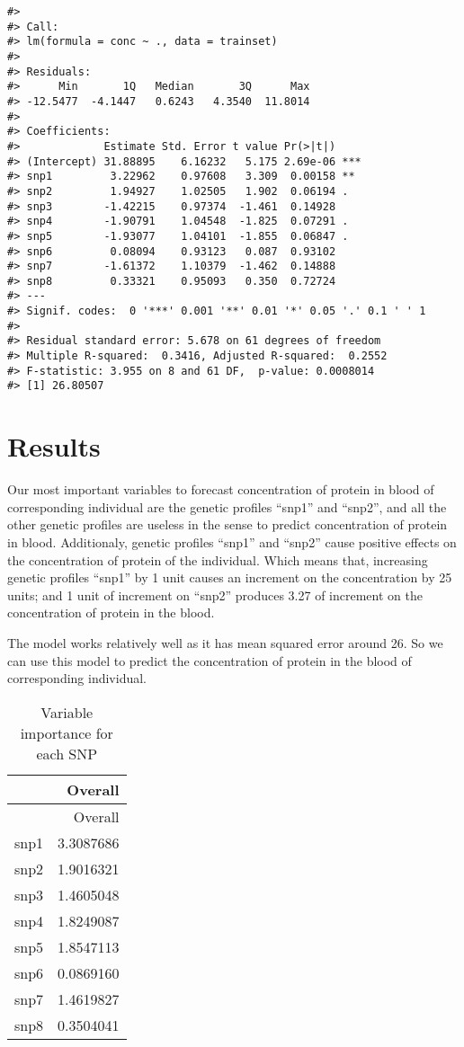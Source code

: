 \documentclass[]{article}
\begin{document}
\footnotesize

\begin{verbatim}
#> 
#> Call:
#> lm(formula = conc ~ ., data = trainset)
#> 
#> Residuals:
#>      Min       1Q   Median       3Q      Max 
#> -12.5477  -4.1447   0.6243   4.3540  11.8014 
#> 
#> Coefficients:
#>             Estimate Std. Error t value Pr(>|t|)    
#> (Intercept) 31.88895    6.16232   5.175 2.69e-06 ***
#> snp1         3.22962    0.97608   3.309  0.00158 ** 
#> snp2         1.94927    1.02505   1.902  0.06194 .  
#> snp3        -1.42215    0.97374  -1.461  0.14928    
#> snp4        -1.90791    1.04548  -1.825  0.07291 .  
#> snp5        -1.93077    1.04101  -1.855  0.06847 .  
#> snp6         0.08094    0.93123   0.087  0.93102    
#> snp7        -1.61372    1.10379  -1.462  0.14888    
#> snp8         0.33321    0.95093   0.350  0.72724    
#> ---
#> Signif. codes:  0 '***' 0.001 '**' 0.01 '*' 0.05 '.' 0.1 ' ' 1
#> 
#> Residual standard error: 5.678 on 61 degrees of freedom
#> Multiple R-squared:  0.3416, Adjusted R-squared:  0.2552 
#> F-statistic: 3.955 on 8 and 61 DF,  p-value: 0.0008014
#> [1] 26.80507
\end{verbatim}

\normalsize

\hypertarget{results}{%
\section{Results}\label{results}}

Our most important variables to forecast concentration of protein in
blood of corresponding individual are the genetic profiles ``snp1'' and
``snp2'', and all the other genetic profiles are useless in the sense to
predict concentration of protein in blood. Additionaly, genetic profiles
``snp1'' and ``snp2'' cause positive effects on the concentration of
protein of the individual. Which means that, increasing genetic profiles
``snp1'' by 1 unit causes an increment on the concentration by 25 units;
and 1 unit of increment on ``snp2'' produces 3.27 of increment on the
concentration of protein in the blood.

The model works relatively well as it has mean squared error around 26.
So we can use this model to predict the concentration of protein in the
blood of corresponding individual.

\begin{longtable}[]{@{}lr@{}}
\caption{Variable importance for each SNP}\tabularnewline
\toprule
& Overall\tabularnewline
\midrule
\endfirsthead
\toprule
& Overall\tabularnewline
\midrule
\endhead
snp1 & 3.3087686\tabularnewline
snp2 & 1.9016321\tabularnewline
snp3 & 1.4605048\tabularnewline
snp4 & 1.8249087\tabularnewline
snp5 & 1.8547113\tabularnewline
snp6 & 0.0869160\tabularnewline
snp7 & 1.4619827\tabularnewline
snp8 & 0.3504041\tabularnewline
\bottomrule
\end{longtable}
\end{document}

